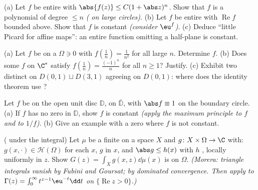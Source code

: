 \begin{exercise}[$\star\star$]\label{exo:b3:holomorphic:4}
(a) Let $f$ be entire with $\abs{f(z)} \leq C(1 + \abs
z)^{n}$. Show that $f$ is a polynomial of degree $\leq n$
\emph{( on large circles)}.
(b) Let $f$ be entire with $\operatorname{Re}f$ bounded above.
Show that $f$ is constant \emph{(consider $\eu^{f}$)}.
(c) Deduce ``little Picard for affine maps'': an entire
function omitting a half-plane is constant.
\end{exercise}

\begin{exercise}[$\star\star$]\label{exo:b3:holomorphic:5}
(a) Let $f$ be  on a  $\Omega \ni 0$ with
$f(\frac1n) = \frac1{n^2}$ for all large $n$. Determine $f$.
(b) Does some  $f$ on $\C^*$ satisfy $f(\frac1n) =
\frac{(-1)^n}{n}$ for all $n \geq 1$? Justify.
(c) Exhibit two distinct  on
$D(0,1)\sqcup D(3,1)$ agreeing on $D(0,1)$: where does the
identity theorem use ?
\end{exercise}

\begin{exercise}[$\star\star$]\label{exo:b3:holomorphic:6}
Let $f$ be  on the open unit disc $\mathbb D$,
 on $\bar{\mathbb D}$, with $\abs f \equiv 1$ on the
boundary circle.
(a) If $f$ has no zero in $\mathbb D$, show $f$ is constant
\emph{(apply the maximum principle to $f$ and to $1/f$)}.
(b) Give an example with a zero where $f$ is not constant.
\end{exercise}

\begin{exercise}[$\star\star$]\label{exo:b3:holomorphic:7}
( under the integral) Let $\mu$ be a finite 
on a space $X$ and $g \colon X\times\Omega \to \C$ with:
$g(x, \cdot) \in \mathcal H(\Omega)$ for each $x$, $g$
 in $x$, and $\abs g \leq h(x)$ with $h$ ,
locally uniformly in $z$. Show $G(z) = \int_Xg(x, z)\dd\mu(x)$
is  on $\Omega$. \emph{(Morera: triangle integrals
vanish by Fubini and Goursat;  by dominated
convergence. Then apply to $\Gamma(z) =
\int_0^\infty t^{z-1}\eu^{-t}\dd t$ on $\{\operatorname{Re}z >
0\}$.)}
\end{exercise}

